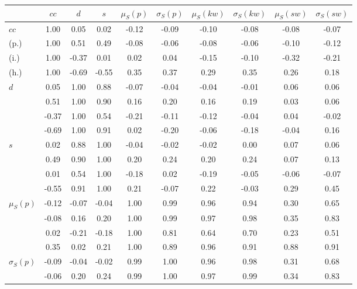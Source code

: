 \begin{table*}[h!]
\begin{center}
\begin{tabular}{| l | c | c | c | c | c | c | c | c | c |}\hline
 & $cc$ & $d$ & $s$ & $\mu_S(p)$ & $\sigma_S(p)$ & $\mu_S(kw)$ & $\sigma_S(kw)$ & $\mu_S(sw)$ & $\sigma_S(sw)$ \\\hline
$cc$ & 1.00  & 0.05  & 0.02  & -0.12  & -0.09  & -0.10  & -0.08  & -0.08  & -0.07 \\\hline
(p.) & 1.00  & 0.51  & 0.49  & -0.08  & -0.06  & -0.08  & -0.06  & -0.10  & -0.12 \\\hline
(i.) & 1.00  & -0.37  & 0.01  & 0.02  & 0.04  & -0.15  & -0.10  & -0.32  & -0.21 \\\hline
(h.) & 1.00  & -0.69  & -0.55  & 0.35  & 0.37  & 0.29  & 0.35  & 0.26  & 0.18 \\\hline
$d$ & 0.05  & 1.00  & 0.88  & -0.07  & -0.04  & -0.04  & -0.01  & 0.06  & 0.06 \\\hline
 & 0.51  & 1.00  & 0.90  & 0.16  & 0.20  & 0.16  & 0.19  & 0.03  & 0.06 \\\hline
 & -0.37  & 1.00  & 0.54  & -0.21  & -0.11  & -0.12  & -0.04  & 0.04  & -0.02 \\\hline
 & -0.69  & 1.00  & 0.91  & 0.02  & -0.20  & -0.06  & -0.18  & -0.04  & 0.16 \\\hline
$s$ & 0.02  & 0.88  & 1.00  & -0.04  & -0.02  & -0.02  & 0.00  & 0.07  & 0.06 \\\hline
 & 0.49  & 0.90  & 1.00  & 0.20  & 0.24  & 0.20  & 0.24  & 0.07  & 0.13 \\\hline
 & 0.01  & 0.54  & 1.00  & -0.18  & 0.02  & -0.19  & -0.05  & -0.06  & -0.07 \\\hline
 & -0.55  & 0.91  & 1.00  & 0.21  & -0.07  & 0.22  & -0.03  & 0.29  & 0.45 \\\hline
$\mu_S(p)$ & -0.12  & -0.07  & -0.04  & 1.00  & 0.99  & 0.96  & 0.94  & 0.30  & 0.65 \\\hline
 & -0.08  & 0.16  & 0.20  & 1.00  & 0.99  & 0.97  & 0.98  & 0.35  & 0.83 \\\hline
 & 0.02  & -0.21  & -0.18  & 1.00  & 0.81  & 0.64  & 0.70  & 0.23  & 0.51 \\\hline
 & 0.35  & 0.02  & 0.21  & 1.00  & 0.89  & 0.96  & 0.91  & 0.88  & 0.91 \\\hline
$\sigma_S(p)$ & -0.09  & -0.04  & -0.02  & 0.99  & 1.00  & 0.96  & 0.98  & 0.31  & 0.68 \\\hline
 & -0.06  & 0.20  & 0.24  & 0.99  & 1.00  & 0.97  & 0.99  & 0.34  & 0.83 \\\hline

\end{tabular}
\end{center}
\end{table*}
